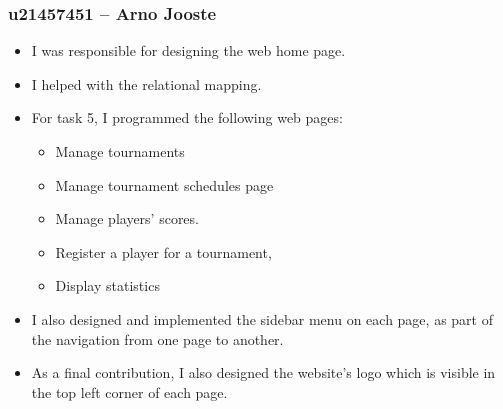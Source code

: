 \documentclass[titlepage]{article}
\begin{document}
\subsubsection*{u21457451 – Arno Jooste}
\vspace{1em}
\begin{itemize}
  \item I was responsible for designing the web home page.
  \item I helped with the relational mapping.
  \item For task 5, I programmed the following web pages:
  \begin{itemize}
    \item Manage tournaments
    \item Manage tournament schedules page
    \item Manage players’ scores. 
    \item Register a player for a tournament,
    \item Display statistics
  \end{itemize}
  \item I also designed and implemented the sidebar menu on each page, as part of the navigation from one page to another. 
  \item As a final contribution, I also designed the website’s logo which is visible in the top left corner of each page.
\end{itemize}
\vspace{1em}
\end{document}
